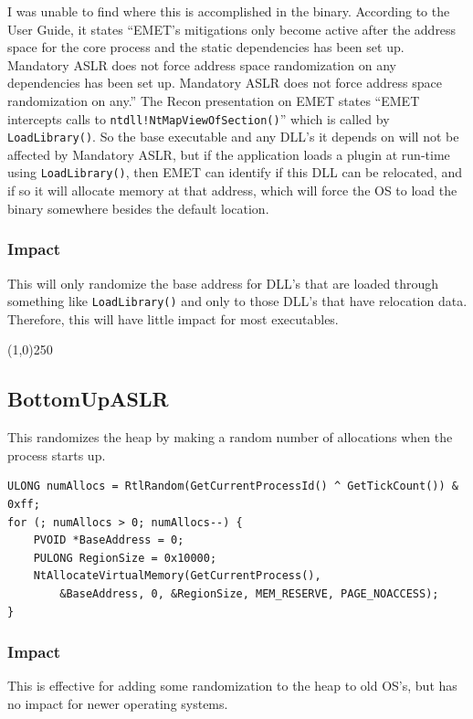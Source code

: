 \documentclass[]{article}
\newcommand{\sectionbreakline}[0]{\begin{center}\line(1,0){250}\end{center}}
\begin{document}
I was unable to find where this is accomplished in the binary.  According to the User Guide\cite{userguide}, it states ``EMET's mitigations only become active after the address space for the core process and the static dependencies has been set up. Mandatory ASLR does not force address space randomization on any dependencies has been set up. Mandatory ASLR does not force address space randomization on any.''  The Recon presentation\cite{inside_emet} on EMET states ``EMET intercepts calls to \texttt{ntdll!NtMapViewOfSection()}'' which is called by \texttt{LoadLibrary()}.  So the base executable and any DLL's it depends on will not be affected by Mandatory ASLR, but if the application loads a plugin at run-time using \texttt{LoadLibrary()}, then EMET can identify if this DLL can be relocated, and if so it will allocate memory at that address, which will force the OS to load the binary somewhere besides the default location.

\subsubsection{Impact}
This will only randomize the base address for DLL's that are loaded through something like \texttt{LoadLibrary()} and only to those DLL's that have relocation data.  Therefore, this will have little impact for most executables.

\sectionbreakline{}









\subsection{BottomUpASLR}\label{bottomupaslr}
This randomizes the heap by making a random number of allocations when the process starts up.

\begin{verbatim}
ULONG numAllocs = RtlRandom(GetCurrentProcessId() ^ GetTickCount()) & 0xff;
for (; numAllocs > 0; numAllocs--) {
    PVOID *BaseAddress = 0;
    PULONG RegionSize = 0x10000;
    NtAllocateVirtualMemory(GetCurrentProcess(),
        &BaseAddress, 0, &RegionSize, MEM_RESERVE, PAGE_NOACCESS);
}
\end{verbatim}

\subsubsection{Impact}
This is effective for adding some randomization to the heap to old OS's, but has no impact for newer operating systems.
\end{document}
